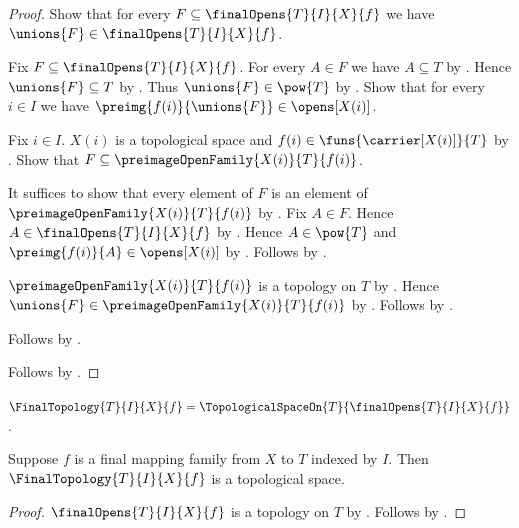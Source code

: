 \begin{proof}
    Show that for every $F\subseteq\finalOpens{T}{I}{X}{f}$ we have
        $\unions{F}\in\finalOpens{T}{I}{X}{f}$.
    \begin{subproof}
        Fix $F\subseteq\finalOpens{T}{I}{X}{f}$.
        For every $A\in F$ we have $A\subseteq T$ by
            .
        Hence $\unions{F}\subseteq T$ by .
        Thus $\unions{F}\in\pow{T}$ by .
        Show that for every $i\in I$ we have
            $\preimg{f(i)}{\unions{F}}\in\opens[X(i)]$.
        \begin{subproof}
            Fix $i\in I$.
            $X(i)$ is a topological space and
                $f(i)\in\funs{\carrier[X(i)]}{T}$ by
                .
            Show that $F\subseteq\preimageOpenFamily{X(i)}{T}{f(i)}$.
            \begin{subproof}
                It suffices to show that every element of $F$ is an element
                    of $\preimageOpenFamily{X(i)}{T}{f(i)}$ by
                    .
                Fix $A\in F$.
                Hence $A\in\finalOpens{T}{I}{X}{f}$ by .
                Hence $A\in\pow{T}$ and
                    $\preimg{f(i)}{A}\in\opens[X(i)]$ by
                    .
                Follows by .
            \end{subproof}
            $\preimageOpenFamily{X(i)}{T}{f(i)}$ is a topology on $T$ by
                .
            Hence $\unions{F}\in\preimageOpenFamily{X(i)}{T}{f(i)}$ by
                .
            Follows by .
        \end{subproof}
        Follows by .
    \end{subproof}
    Follows by .
\end{proof}

\begin{definition}\label{final_topology}
    $\FinalTopology{T}{I}{X}{f}
        =\TopologicalSpaceOn{T}{\finalOpens{T}{I}{X}{f}}$.
\end{definition}

\begin{classification}\label{final_topology_is_topological_space}
    Suppose $f$ is a final mapping family from $X$ to $T$ indexed by $I$.
    Then $\FinalTopology{T}{I}{X}{f}$ is a topological space.
\end{classification}
\begin{proof}
    $\finalOpens{T}{I}{X}{f}$ is a topology on $T$ by
        .
    Follows by
        .
\end{proof}


